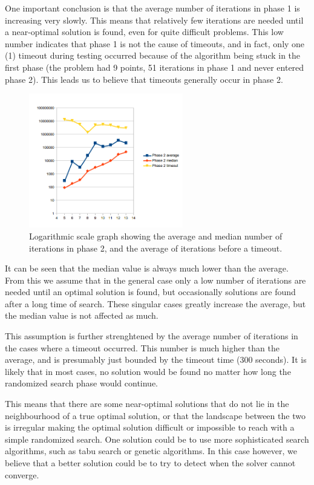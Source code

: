 \documentclass[a4paper,12pt]{article}
\begin{document}
One important conclusion is that the average number of iterations in phase 1 is increasing very slowly. This means that relatively few iterations are needed until a near-optimal solution is found, even for quite difficult problems. This low number indicates that phase 1 is not the cause of timeouts, and in fact, only one (1) timeout during testing occurred because of the algorithm being stuck in the first phase (the problem had 9 points, 51 iterations in phase 1 and never entered phase 2). This leads us to believe that timeouts generally occur in phase 2.


\begin{figure}[!ht]
\begin{center}
\includegraphics[width=0.6\textwidth]{pictures/phase2iterations.png}
 \caption[Close up of \textit{Hemidactylus} sp.]
   {Logarithmic scale graph showing the average and median number of iterations in phase 2, and the average of iterations before a timeout.}
\end{center}
\end{figure}

It can be seen that the median value is always much lower than the average. From this we assume that in the general case only a low number of iterations are needed until an optimal solution is found, but occasionally solutions are found after a long time of search. These singular cases greatly increase the average, but the median value is not affected as much.

This assumption is further strenghtened by the average number of iterations in the cases where a timeout occurred. This number is much higher than the average, and is presumably just bounded by the timeout time (300 seconds). It is likely that in most cases, no solution would be found no matter how long the randomized search phase would continue.

This means that there are some near-optimal solutions that do not lie in the neighbourhood of a true optimal solution, or that the landscape between the two is irregular making the optimal solution difficult or impossible to reach with a simple randomized search. One solution could be to use more sophisticated search algorithms, such as tabu search or genetic algorithms. In this case however, we believe that a better solution could be to try to detect when the solver cannot converge.
\end{document}

